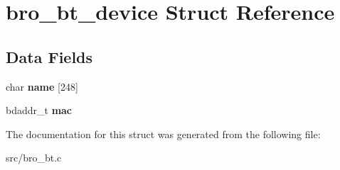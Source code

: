 \hypertarget{structbro__bt__device}{
\section{bro\_\-bt\_\-device Struct Reference}
\label{structbro__bt__device}
}
\subsection*{Data Fields}
\begin{DoxyCompactItemize}
\item 
\hypertarget{structbro__bt__device_ab68bf00ae4a0036aee3d3371354748de}{
char {\bfseries name} \mbox{[}248\mbox{]}}
\label{structbro__bt__device_ab68bf00ae4a0036aee3d3371354748de}

\item 
\hypertarget{structbro__bt__device_a948e84481473311b7e41236653773e60}{
bdaddr\_\-t {\bfseries mac}}
\label{structbro__bt__device_a948e84481473311b7e41236653773e60}

\end{DoxyCompactItemize}


The documentation for this struct was generated from the following file:\begin{DoxyCompactItemize}
\item 
src/bro\_\-bt.c\end{DoxyCompactItemize}
